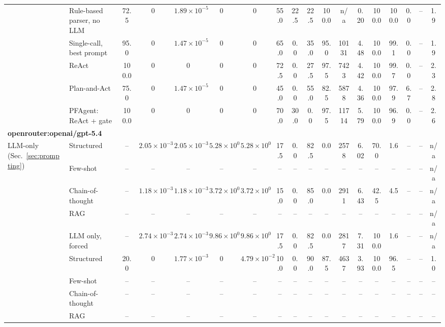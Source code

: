{\begin{tabular}{ll ccccc cccc cc c cc cc}
\addlinespace
\multirow{5}{*}{Architectures (Sec.~\ref{sec:agents})} & Rule-based parser, no LLM & 72.5 & 0 & $1.89{\times}10^{-5}$ & 0 & 0 & 55.0 & 22.5 & 22.5 & 100.0 & n/a & 0.20 & 100.0 & 100.0 & 0.0 & -- & 1.9 \\
 & Single-call, best prompt & 95.0 & 0 & $1.47{\times}10^{-5}$ & 0 & 0 & 65.0 & 0.0 & 35.0 & 95.0 & 10131 & 4.48 & 100.0 & 99.1 & 0.0 & -- & 1.9 \\
 & ReAct & 100.0 & 0 & 0 & 0 & 0 & 72.5 & 0.0 & 27.5 & 97.5 & 7423 & 4.42 & 100.0 & 99.7 & 0.0 & -- & 2.3 \\
 & Plan-and-Act & 75.0 & 0 & $1.47{\times}10^{-5}$ & 0 & 0 & 45.0 & 0.0 & 55.0 & 82.5 & 5878 & 4.36 & 100.0 & 97.9 & 6.7 & -- & 2.8 \\
 & PFAgent: ReAct + gate & 100.0 & 0 & 0 & 0 & 0 & 70.0 & 30.0 & 0.0 & 97.5 & 11714 & 5.79 & 100.0 & 96.9 & 0.0 & -- & 2.6 \\
\midrule
\multicolumn{18}{l}{\textbf{openrouter:openai/gpt-5.4}} \\
\multirow{5}{*}{LLM-only (Sec.~\ref{sec:prompting})} & Structured & -- & $2.05{\times}10^{-3}$ & $2.05{\times}10^{-3}$ & $5.28{\times}10^{0}$ & $5.28{\times}10^{0}$ & 17.5 & 0.0 & 82.5 & 0.0 & 2578 & 6.02 & 70.0 & 1.6 & -- & -- & n/a \\
 & Few-shot & -- & -- & -- & -- & -- & -- & -- & -- & -- & -- & -- & -- & -- & -- & -- & n/a \\
 & Chain-of-thought & -- & $1.18{\times}10^{-3}$ & $1.18{\times}10^{-3}$ & $3.72{\times}10^{0}$ & $3.72{\times}10^{0}$ & 15.0 & 0.0 & 85.0 & 0.0 & 2911 & 6.43 & 42.5 & 4.5 & -- & -- & n/a \\
 & RAG & -- & -- & -- & -- & -- & -- & -- & -- & -- & -- & -- & -- & -- & -- & -- & n/a \\
 & LLM only, forced & -- & $2.74{\times}10^{-3}$ & $2.74{\times}10^{-3}$ & $9.86{\times}10^{0}$ & $9.86{\times}10^{0}$ & 17.5 & 0.0 & 82.5 & 0.0 & 2817 & 7.31 & 100.0 & 1.6 & -- & -- & n/a \\
\addlinespace
\multirow{4}{*}{Single-call (Sec.~\ref{sec:prompting})} & Structured & 20.0 & 0 & $1.77{\times}10^{-3}$ & 0 & $4.79{\times}10^{-2}$ & 10.0 & 0.0 & 90.0 & 87.5 & 4637 & 3.93 & 100.0 & 96.5 & -- & -- & 1.0 \\
 & Few-shot & -- & -- & -- & -- & -- & -- & -- & -- & -- & -- & -- & -- & -- & -- & -- & -- \\
 & Chain-of-thought & -- & -- & -- & -- & -- & -- & -- & -- & -- & -- & -- & -- & -- & -- & -- & -- \\
 & RAG & -- & -- & -- & -- & -- & -- & -- & -- & -- & -- & -- & -- & -- & -- & -- & -- \\

\end{tabular}}
